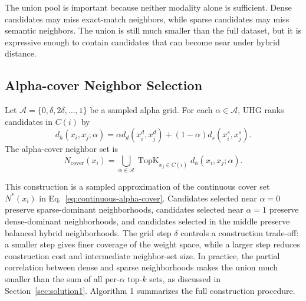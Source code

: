 The union pool is important because neither modality alone is sufficient. Dense candidates may miss exact-match neighbors, while sparse candidates may miss semantic neighbors. The union is still much smaller than the full dataset, but it is expressive enough to contain candidates that can become near under hybrid distance.

\subsection{Alpha-cover Neighbor Selection}

Let $\mathcal{A}=\{0,\delta,2\delta,\ldots,1\}$ be a sampled alpha grid. For each $\alpha\in\mathcal{A}$, UHG ranks candidates in $C(i)$ by
\begin{equation}
    d_h(x_i,x_j;\alpha)=\alpha d_d(x_i^d,x_j^d)+(1-\alpha)d_s(x_i^s,x_j^s).
\end{equation}
The alpha-cover neighbor set is
\begin{equation}
    N_{\mathrm{cover}}(x_i)=
    \bigcup_{\alpha\in\mathcal{A}}
    \operatorname{TopK}_{x_j\in C(i)}d_h(x_i,x_j;\alpha).
    \label{eq:alpha-cover}
\end{equation}

This construction is a sampled approximation of the continuous cover set $N^*(x_i)$ in Eq.~\eqref{eq:continuous-alpha-cover}. Candidates selected near $\alpha=0$ preserve sparse-dominant neighborhoods, candidates selected near $\alpha=1$ preserve dense-dominant neighborhoods, and candidates selected in the middle preserve balanced hybrid neighborhoods. The grid step $\delta$ controls a construction trade-off: a smaller step gives finer coverage of the weight space, while a larger step reduces construction cost and intermediate neighbor-set size. In practice, the partial correlation between dense and sparse neighborhoods makes the union much smaller than the sum of all per-$\alpha$ top-$k$ sets, as discussed in Section~\ref{sec:solution1}. Algorithm 1 summarizes the full construction procedure.

